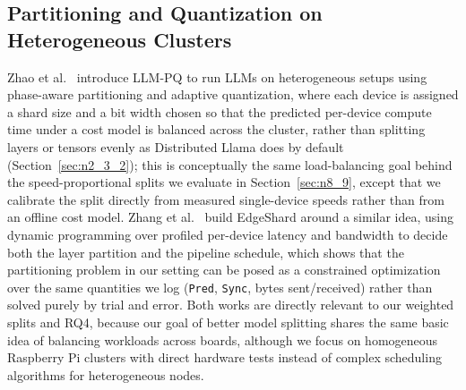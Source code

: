 \documentclass[11pt,a4paper]{article}
\begin{document}
\subsection{Partitioning and Quantization on Heterogeneous Clusters}\label{sec:n3_2}
Zhao et al.~\cite{zhao2024} introduce LLM-PQ to run LLMs on heterogeneous setups using phase-aware partitioning and adaptive quantization, where each device is assigned a shard size and a bit width chosen so that the predicted per-device compute time under a cost model is balanced across the cluster, rather than splitting layers or tensors evenly as Distributed Llama does by default (Section~\ref{sec:n2_3_2}); this is conceptually the same load-balancing goal behind the speed-proportional splits we evaluate in Section~\ref{sec:n8_9}, except that we calibrate the split directly from measured single-device speeds rather than from an offline cost model. Zhang et al.~\cite{zhang2024edgeshard} build EdgeShard around a similar idea, using dynamic programming over profiled per-device latency and bandwidth to decide both the layer partition and the pipeline schedule, which shows that the partitioning problem in our setting can be posed as a constrained optimization over the same quantities we log (\texttt{Pred}, \texttt{Sync}, bytes sent/received) rather than solved purely by trial and error. Both works are directly relevant to our weighted splits and RQ4, because our goal of better model splitting shares the same basic idea of balancing workloads across boards, although we focus on homogeneous Raspberry Pi clusters with direct hardware tests instead of complex scheduling algorithms for heterogeneous nodes.
\end{document}
